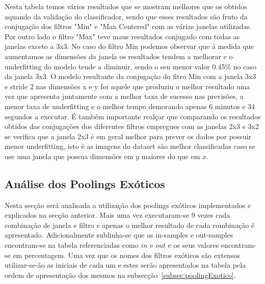 Nesta tabela temos vários resultados que se mostram melhores que os obtidos aquando da validação do classificador, sendo que esses resultados são fruto da conjugação dos filtros "Min" e "Max Centered" com as várias janelas utilizadas. Por outro lado o filtro "Max" teve maus resultados conjugado com todas as janelas exceto a 3x3. \newline
No caso do filtro Min podemos observar que á medida que aumentamos as dimensões da janela os resultados tendem a melhorar e o underfitting do modelo tende a diminuir, sendo o seu menor valor 0.45\% no caso da janela 3x3. O modelo resultante da conjugação do fitro Min com a janela 3x3 e stride 2 nas dimensões x e y foi aquele que produziu o melhor resultado uma vez que apresenta juntamente com a melhor taxa de sucesso nas previsões, a menor taxa de underfitting e o melhor tempo demorando apenas 6 minutos e 34 segundos a executar.\newline
É também importante realçar que comparando os resultados obtidos das conjugações dos diferentes filtros empregues com as janelas 2x3 e 3x2 se verifica que a janela 2x3 é em geral melhor para prever os dados por possuir menor underfitting, isto é as imagens do dataset são melhor classificadas caso se use uma janela que possua dimensões em $y$ maiores do que em $x$.



\subsection{Análise dos Poolings Exóticos}

Nesta secção será analisada a utilização dos poolings exóticos implementados e explicados na secção anterior. Mais uma vez executaram-se 9 vezes cada combinação de janela e filtro e apenas o melhor resultado de cada combinação é apresentado. Adicionalmente sublinha-se que as in-samples e out-samples encontram-se na tabela referenciadas como $in$ e $out$ e os seus valores encontram-se em percentagem. Uma vez que os nomes dos filtros exóticos são extensos utilizar-se-ão as iniciais de cada um e estes serão apresentados na tabela pela ordem de apresentação dos mesmos na subsecção~\ref{subsec:poolingExotico}. 



